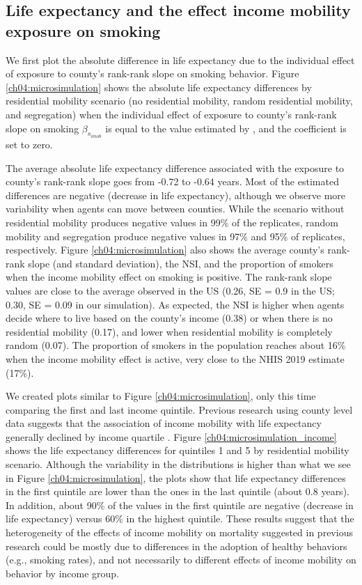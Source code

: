 \documentclass[class=article, crop=false, 12pt]{standalone}
\begin{document}
\subsection{Life expectancy and the effect income mobility exposure on smoking}

We first plot the absolute difference in life expectancy due to the individual effect of exposure to county's rank-rank slope on smoking behavior. Figure \ref{ch04:microsimulation} shows the absolute life expectancy differences by residential mobility scenario (no residential mobility, random residential mobility, and segregation) when the individual effect of exposure to county's rank-rank slope on smoking $\beta_{s_{imob}}$ is equal to the value estimated by \citet{daza2021}, and the coefficient is set to zero. 

The average absolute life expectancy difference associated with the exposure to county's rank-rank slope goes from -0.72 to -0.64 years. Most of the estimated differences are negative (decrease in life expectancy), although we observe more variability when agents can move between counties. While the scenario without residential mobility produces negative values in 99\% of the replicates, random mobility and segregation produce negative values in 97\% and 95\% of replicates, respectively. Figure \ref{ch04:microsimulation} also shows the average county's rank-rank slope (and standard deviation), the NSI, and the proportion of smokers when the income mobility effect on smoking is positive. The rank-rank slope values are close to the average observed in the US (0.26, SE = 0.9 in the US; 0.30, SE = 0.09 in our simulation). As expected, the NSI is higher when agents decide where to live based on the county's income (0.38) or when there is no residential mobility (0.17), and lower when residential mobility is completely random (0.07). The proportion of smokers in the population reaches about 16\% when the income mobility effect is active, very close to the NHIS 2019 estimate (17\%).

We created plots similar to  Figure \ref{ch04:microsimulation}, only this time comparing the first and last income quintile. Previous research using county level data suggests that the association of income mobility with life expectancy generally declined by income quartile \citep{venkataramani2020}. Figure \ref{ch04:microsimulation_income} shows the life expectancy differences for quintiles 1 and 5 by residential mobility scenario. Although the variability in the distributions is higher than what we see in Figure \ref{ch04:microsimulation}, the plots show that life expectancy differences in the first quintile are lower than the ones in the last quintile (about 0.8 years). In addition, about 90\% of the values in the first quintile are negative (decrease in life expectancy) versus 60\% in the highest quintile. These results suggest that the heterogeneity of the effects of income mobility on mortality suggested in previous research could be mostly due to differences in the adoption of healthy behaviors (e.g., smoking rates), and not necessarily to different effects of income mobility on behavior by income group. 
\end{document}
